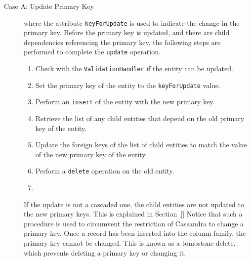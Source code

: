 		\begin{description}
			\item [Case A: Update Primary Key]  where the attribute
			\texttt{keyForUpdate} is used to indicate the change in the primary key.
			Before the primary key is updated, and there are child dependencies referencing
			the primary key,  the following steps are performed to complete the
			\texttt{update} operation.
			\begin{enumerate}
			  
			  
			\item Check with the \texttt{ValidationHandler} if the entity can be updated.
		
			
			\item Set the primary key of the entity to the \texttt{keyForUpdate} value. 
			
			\item Perform an \texttt{insert} of the entity with the new primary key.
			
			\item Retrieve the list of any child entities that depend on the old primary key
			of the entity.

			\item Update the foreign keys of the list of child entities to match the value
			of the new primary key of the entity.
			
			\item Perform a \texttt{delete} operation on the old entity.
		\item

			\end{enumerate}
		
			If the update is not a cascaded one, the child entities are not updated to
			the new primary keys. This is explained in Section~\ref{} Notice that such a
			procedure is used to circumvent the restriction of Cassandra to change a primary key.  Once a record has been
			inserted into the column family,  the primary key cannot  be changed.  This is
			known as a tombstone delete,  which prevents deleting a primary key or
			changing it. 
		

\end{description}
